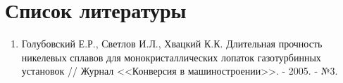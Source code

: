 \documentclass[14pt]{extarticle}
\begin{document}
    
    
    
    
    
    
    
    
    

    \section{Список литературы}
        \begin{enumerate}
            \item Голубовский Е.Р., Светлов И.Л., Хвацкий К.К. Длительная прочность никелевых сплавов для
                монокристаллических лопаток газотурбинных установок // Журнал <<Конверсия в машиностроении>>. - 2005. - №3.
        \end{enumerate}
\end{document}
